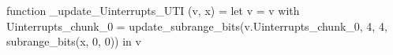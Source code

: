 function _update_Uinterrupts_UTI (v, x) = let v = { v with Uinterrupts_chunk_0 = update_subrange_bits(v.Uinterrupts_chunk_0, 4, 4, subrange_bits(x, 0, 0)) } in
  v
